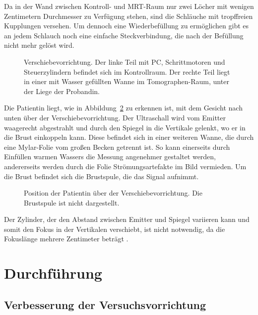 \documentclass[
    11pt,
    ngerman
]{scrbook}
\begin{document}
Da in der Wand zwischen Kontroll- und MRT-Raum nur zwei Löcher mit wenigen
Zentimetern Durchmesser zu Verfügung stehen, sind die Schläuche mit
tropffreien Kupplungen versehen. Um dennoch eine Wiederbefüllung zu ermöglichen
gibt es an jedem Schlauch noch eine einfache Steckverbindung, die nach der
Befüllung nicht mehr gelöst wird.

\begin{figure}[htbp]
    \centering
    \resizebox{\textwidth}{!}{}
    \caption{%
        Verschiebevorrichtung. Der linke Teil mit PC, Schrittmotoren und Steuerzylindern befindet sich im Kontrollraum. Der rechte Teil liegt in einer mit Wasser gefüllten Wanne im Tomographen-Raum, unter der Liege der Probandin.
    }
    \label{fig:aufbau_total}
\end{figure}

Die Patientin liegt, wie in Abbildung~\ref{fig:aufbau_emitter_spiegel} zu
erkennen ist, mit dem Gesicht nach unten über der Verschiebevorrichtung. Der
Ultraschall wird vom Emitter waagerecht abgestrahlt und durch den Spiegel in
die Vertikale gelenkt, wo er in die Brust einkoppeln kann. Diese befindet sich
in einer weiteren Wanne, die durch eine Mylar-Folie vom großen Becken getrennt
ist. So kann einerseits durch Einfüllen warmen Wassers die Messung angenehmer
gestaltet werden, andererseits werden durch die Folie Strömungsartefakte im
Bild vermieden. Um die Brust befindet sich die Brustspule, die das Signal
aufnimmt.

\begin{figure}[htbp]
    \centering
    \resizebox{.9\textwidth}{!}{}
    \caption{%
        Position der Patientin über der Verschiebevorrichtung. Die Brustspule ist nicht dargestellt.
    }
    \label{fig:aufbau_emitter_spiegel}
\end{figure}

Der Zylinder, der den Abstand zwischen Emitter und Spiegel variieren kann und
somit den Fokus in der Vertikalen verschiebt, ist nicht notwendig, da die
Fokuslänge mehrere Zentimeter beträgt \parencite{dipl_kofahl}.

\chapter{Durchführung}

\section{Verbesserung der Versuchsvorrichtung}
\end{document}
